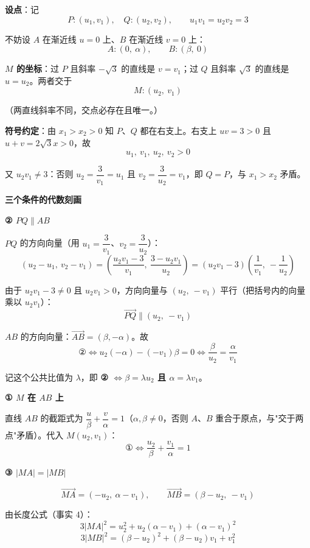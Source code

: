 \textbf{设点}：记
\[P:\left(u_1,v_1\right),\quad Q:\left(u_2,v_2\right),\qquad u_1v_1=u_2v_2=3\]

不妨设 $A$ 在渐近线 $u=0$ 上、$B$ 在渐近线 $v=0$ 上：
\[A:(0,\ \alpha),\qquad B:(\beta,\ 0)\]

\textbf{$M$ 的坐标}：过 $P$ 且斜率 $-\sqrt3$ 的直线是 $v=v_1$；过 $Q$ 且斜率 $\sqrt3$ 的直线是 $u=u_2$。两者交于
\[\boxed{M:\left(u_2,\ v_1\right)}\]

（两直线斜率不同，交点必存在且唯一。）

\textbf{符号约定}：由 $x_1>x_2>0$ 知 $P$、$Q$ 都在右支上。右支上 $uv=3>0$ 且 $u+v=2\sqrt3x>0$，故
\[u_1,\ v_1,\ u_2,\ v_2>0\]

又 $u_2v_1\ne3$：否则 $u_2=\dfrac3{v_1}=u_1$ 且 $v_2=\dfrac3{u_2}=v_1$，即 $Q=P$，与 $x_1>x_2$ 矛盾。

\par\medskip

\textbf{三个条件的代数刻画}

\textbf{② $PQ\parallel AB$}

$PQ$ 的方向向量（用 $u_1=\dfrac3{v_1}$、$v_2=\dfrac3{u_2}$）：
\[\left(u_2-u_1,\ v_2-v_1\right)=\left(\frac{u_2v_1-3}{v_1},\ \frac{3-u_2v_1}{u_2}\right)=\left(u_2v_1-3\right)\left(\frac1{v_1},\ -\frac1{u_2}\right)\]

由于 $u_2v_1-3\ne0$ 且 $u_2v_1>0$，方向向量与 $\left(u_2,\ -v_1\right)$ 平行（把括号内的向量乘以 $u_2v_1$）：
\[\overrightarrow{PQ}\parallel\left(u_2,\ -v_1\right)\]

$AB$ 的方向向量：$\overrightarrow{AB}=(\beta,-\alpha)$。故
\[\text{②}\iff u_2(-\alpha)-\left(-v_1\right)\beta=0\iff\frac\beta{u_2}=\frac\alpha{v_1}\]

记这个公共比值为 $\lambda$，即 \textbf{② $\iff\beta=\lambda u_2$ 且 $\alpha=\lambda v_1$}。

\textbf{① $M$ 在 $AB$ 上}

直线 $AB$ 的截距式为 $\dfrac u\beta+\dfrac v\alpha=1$（$\alpha,\beta\ne0$，否则 $A$、$B$ 重合于原点，与"交于两点"矛盾）。代入 $M\left(u_2,v_1\right)$：
\[\text{①}\iff\frac{u_2}\beta+\frac{v_1}\alpha=1\]

\textbf{③ $|MA|=|MB|$}

\[\overrightarrow{MA}=\left(-u_2,\ \alpha-v_1\right),\qquad\overrightarrow{MB}=\left(\beta-u_2,\ -v_1\right)\]

由长度公式（事实 4）：
\[3|MA|^{2}=u_2^{2}+u_2\left(\alpha-v_1\right)+\left(\alpha-v_1\right)^{2}\]
\[3|MB|^{2}=\left(\beta-u_2\right)^{2}+\left(\beta-u_2\right)v_1+v_1^{2}\]

